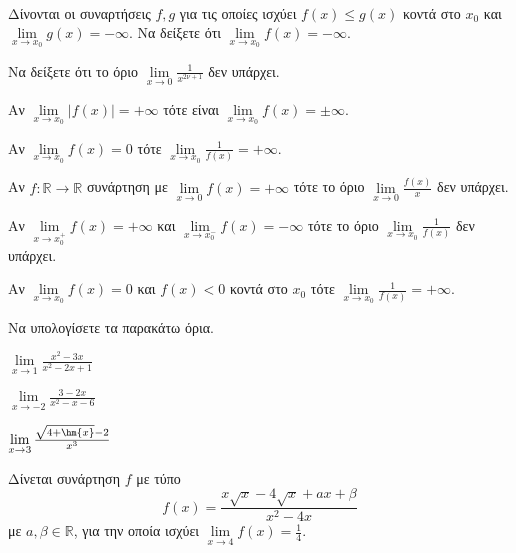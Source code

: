 \documentclass[ektypwsh]{frontisthrio-diag}
\begin{document}
\begin{thema}
\item\mbox{}\\\vspace{-7mm}
\begin{erwthma}
\item Δίνονται οι συναρτήσεις $ f,g $ για τις οποίες ισχύει $ f(x)\leq g(x) $ κοντά στο $ x_0 $ και $ \lim\limits_{x\to x_0}{g(x)}=-\infty $. Να δείξετε ότι $ \lim\limits_{x\to x_0}{f(x)}=-\infty $.
\item Να δείξετε ότι το όριο $ \lim\limits_{x\to 0}{\frac{1}{x^{2\nu+1}}} $ δεν υπάρχει.
\item \swstolathospan
\begin{alist}
\item Αν $ \lim\limits_{x\to x_0}{|f(x)|}=+\infty $ τότε είναι $ \lim\limits_{x\to x_0}{f(x)}=\pm\infty $.
\item Αν $ \lim\limits_{x\to x_0}{f(x)}=0 $ τότε $ \lim\limits_{x\to x_0}{\frac{1}{f(x)}}=+\infty $.
\item Αν $ f:\mathbb{R}\to\mathbb{R} $ συνάρτηση με $ \lim\limits_{x\to 0}{f(x)}=+\infty $ τότε το όριο $ \lim\limits_{x\to 0}{\frac{f(x)}{x}} $ δεν υπάρχει.
\item Αν $ \lim\limits_{x\to x_0^+}{f(x)}=+\infty $ και $ \lim\limits_{x\to x_0^-}{f(x)}=-\infty $ τότε το όριο $ \lim\limits_{x\to x_0}{\frac{1}{f(x)}} $ δεν υπάρχει.
\item Αν $ \lim\limits_{x\to x_0}{f(x)}=0 $ και $ f(x)<0 $ κοντά στο $ x_0 $ τότε $ \lim\limits_{x\to x_0}\frac{1}{f(x)}=+\infty $.
\end{alist}
\end{erwthma}
\item Να υπολογίσετε τα παρακάτω όρια.
\begin{multicols}{2}
\begin{erwthma}
\item $ \lim\limits_{x\to 1}{\frac{x^2-3x}{x^2-2x+1}} $
\item $ \lim\limits_{x\to -2}{\frac{3-2x}{x^2-x-6}} $
\item $ \lim\limits_{x\to 3}{\frac{\sqrt{4+\hm{x}}-2}{x^3}} $
\end{erwthma}
\end{multicols}
\item Δίνεται συνάρτηση $ f $ με τύπο \[ f(x)=\frac{x\sqrt{x}-4\sqrt{x}+ax+\beta}{x^2-4x} \]
με $ a,\beta\in\mathbb{R} $, για την οποία ισχύει $ \lim\limits_{x\to 4}{f(x)}=\frac{1}{4} $.

\end{thema}
\end{document}
